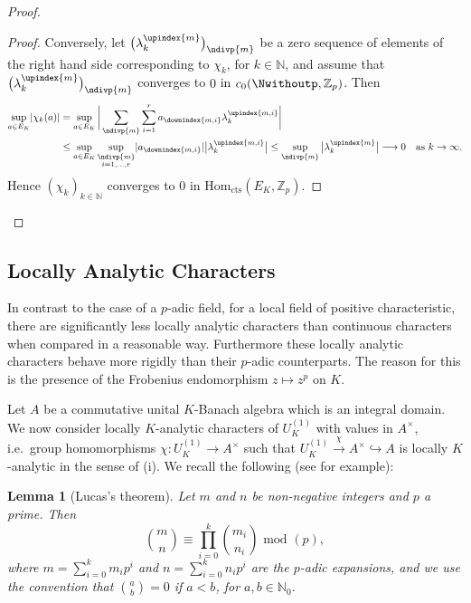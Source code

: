 \documentclass[a4paper, reqno, 10pt]{amsart}
\newtheorem{lemma}[theorem]{Lemma}
\theoremstyle{definition}
\numberwithin{equation}{section}
\newcommand{\cont}{{\mathrm{cts}}}
\newcommand{\Hom}{{\mathrm{Hom}}}
\newcommand{\lra}{\longrightarrow}
\renewcommand{\mod}{{\,\,\mathrm{mod}\,\,}}
\newcommand{\mto}{\mapsto}
\newcommand{\ra}{\rightarrow}
\newcommand{\unts}{^{\times}}
\newcommand{\BN}{{\mathbb {N}}}
\newcommand{\BZ}{{\mathbb {Z}}}
\begin{document}
\begin{proof}
\begin{proof}
		
		Conversely, let $\big( \lambda_k^\upindex{m} \big)_\ndivp{m}$ be a zero sequence of elements of the right hand side corresponding to $\chi_k$, for $k\in \BN$, and assume that $\big( \lambda_k^\upindex{m} \big)_\ndivp{m}$ converges to $0$ in $c_0(\Nwithoutp,\BZ_p)$.
		Then
		\begin{align*}
			\sup_{a \in E_K} \lvert \chi_k(a)  \rvert 
			&= \sup_{a\in E_K} \bigg\lvert \sum_\ndivp{m} \sum_{i=1}^r a_\downindex{m,i}  \lambda_k^\upindex{m,i}  \bigg\rvert \\			
			&\leq \sup_{a \in E_K} \sup_{\substack{\ndivp{m} \\ i=1,\ldots,r}} \lvert a_\downindex{m,i} \rvert \big\lvert \lambda_k^\upindex{m,i} \big\rvert 
			\leq \sup_{\ndivp{m}} \big\lvert \lambda_k^\upindex{m} \big\rvert \lra 0 \quad\text{as $k \ra \infty$.}
		\end{align*}
		Hence $(\chi_k)_{k\in \BN}$ converges to $0$ in $\Hom_\cont (E_K, \BZ_p)$.
	\end{proof}
	
	
\end{proof}



\subsection{Locally Analytic Characters}


In contrast to the case of a $p$-adic field, for a local field of positive characteristic, there are significantly less locally analytic characters than continuous characters when compared in a reasonable way.
Furthermore these locally analytic characters behave more rigidly than their $p$-adic counterparts.
The reason for this is the presence of the Frobenius endomorphism $z \mto z^p$ on $K$. 

Let $A$ be a commutative unital $K$-Banach algebra which is an integral domain.
We now consider locally $K$-analytic characters of $U_K^{(1)}$ with values in $A\unts$, i.e.\ group homomorphisms $\chi \colon U_K^{(1)} \ra A\unts$ such that $U_K^{(1)} \xrightarrow{\chi} A\unts \hookrightarrow A$ is locally $K$-analytic in the sense of  (i).
We recall the following (see \cite{Jeong11CalcPosChar} for example):

\begin{lemma}[Lucas's theorem]\label{Lemma A2 - Lucas's Theorem}
	Let $m$ and $n$ be non-negative integers and $p$ a prime.
	Then
	\[ \binom{m}{n} \equiv \prod_{i=0}^{k} \binom{m_i}{n_i}  \mod (p) , \]
	where $m = \sum_{i=0}^k m_i p^i$ and $n = \sum_{i=0}^k n_i p^i$ are the $p$-adic expansions, and we use the convention that $\binom{a}{b} = 0$ if $a < b$, for $a,b \in \BN_0$.
\end{lemma}
\end{document}
